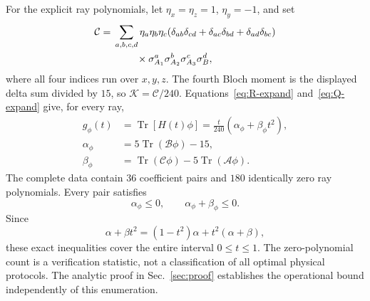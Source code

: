 \documentclass[aps,pra,reprint,amsmath,amssymb,longbibliography,nofootinbib]{revtex4-2}
\newcommand{\Tr}{\operatorname{Tr}}
\newcommand{\cB}{\mathcal B}
\newcommand{\cA}{\mathcal A}
\newcommand{\cC}{\mathcal C}
\begin{document}
For the explicit ray polynomials, let $\eta_x=\eta_z=1$, $\eta_y=-1$, and set
\begin{align}
 \cC={}&\sum_{a,b,c,d}\eta_a\eta_b\eta_c
 (\delta_{ab}\delta_{cd}+\delta_{ac}\delta_{bd}
                         +\delta_{ad}\delta_{bc})\nonumber\\
 &\hspace{8mm}\times\sigma^a_{A_1}\sigma^b_{A_2}
                          \sigma^c_{A_3}\sigma^d_B,
 \label{eq:C}
\end{align}
where all four indices run over $x,y,z$. The fourth Bloch moment is the displayed delta sum divided by $15$, so $\mathcal K=\cC/240$. Equations~\eqref{eq:R-expand} and~\eqref{eq:Q-expand} give, for every ray,
\begin{align}
 g_\phi(t)&=\Tr[H(t)\phi]=\frac{t}{240}
                  (\alpha_\phi+\beta_\phi t^2),
 \label{eq:ray}\\
 \alpha_\phi&=5\Tr(\cB\phi)-15,\nonumber\\
 \beta_\phi&=\Tr(\cC\phi)-5\Tr(\cA\phi).
 \label{eq:coefficients}
\end{align}
The complete data contain $36$ coefficient pairs and $180$ identically zero ray polynomials. Every pair satisfies
\begin{equation}
 \alpha_\phi\leq0,\qquad\alpha_\phi+\beta_\phi\leq0.
 \label{eq:endpoints-ray}
\end{equation}
Since
\begin{equation}
 \alpha+\beta t^2=(1-t^2)\alpha+t^2(\alpha+\beta),
\end{equation}
these exact inequalities cover the entire interval $0\leq t\leq1$. The zero-polynomial count is a verification statistic, not a classification of all optimal physical protocols. The analytic proof in Sec.~\ref{sec:proof} establishes the operational bound independently of this enumeration.


\end{document}
